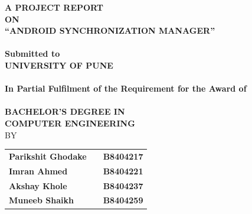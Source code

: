 
\newpage


\begin{center}
\thispagestyle{empty}


\Large{\textbf{A PROJECT REPORT\\ON}}\\[0.7cm]
\Large{\textsc {\textbf{``ANDROID SYNCHRONIZATION MANAGER''}}}\\[0.5cm]
\Large{\textbf{\\Submitted to}}
\LARGE{\textbf{\\UNIVERSITY OF PUNE\\}}
\large{\textbf{\\In Partial Fulfilment of the Requirement for the Award of\\}}
\LARGE{\textbf{\\BACHELOR'S DEGREE IN\\COMPUTER ENGINEERING}}
\LARGE{\\BY}\\[0.5cm]
\begin{table}[h]
\centering
\begin{tabular}{>{\bfseries}lc>{\bfseries}r}
Parikshit Ghodake & & B8404217\\ %
Imran Ahmed & & B8404221\\ %
Akshay Khole & & B8404237\\ %
Muneeb Shaikh & & B8404259\\ %
\end{tabular}
\end{table}




\end{center}
